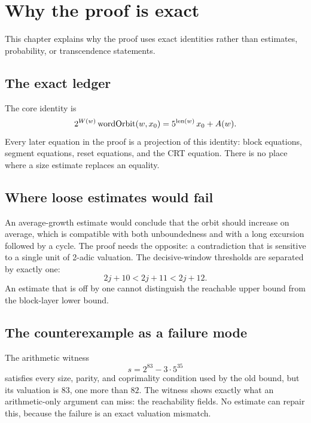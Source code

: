 \section{Why the proof is exact}

This chapter explains why the proof uses exact identities rather than
estimates, probability, or transcendence statements.

\subsection{The exact ledger}

The core identity is
\begin{equation*}
  2^{W(w)}\,\mathrm{wordOrbit}(w,x_0)
    =5^{\operatorname{len}(w)}\,x_0+A(w).
\end{equation*}
Every later equation in the proof is a projection of this identity:
block equations, segment equations, reset equations, and the CRT
equation.  There is no place where a size estimate replaces an
equality.

\subsection{Where loose estimates would fail}

An average-growth estimate would conclude that the orbit should
increase on average, which is compatible with both unboundedness and
with a long excursion followed by a cycle.  The proof needs the
opposite: a contradiction that is sensitive to a single unit of
2-adic valuation.  The decisive-window thresholds are separated by
exactly one:
\begin{equation*}
  2j+10<2j+11<2j+12.
\end{equation*}
An estimate that is off by one cannot distinguish the reachable upper
bound from the block-layer lower bound.

\subsection{The counterexample as a failure mode}

The arithmetic witness
\begin{equation*}
  s=2^{83}-3\cdot5^{35}
\end{equation*}
satisfies every size, parity, and coprimality condition used by the
old bound, but its valuation is $83$, one more than $82$.  The witness
shows exactly what an arithmetic-only argument can miss: the
reachability fields.  No estimate can repair this, because the failure
is an exact valuation mismatch.

